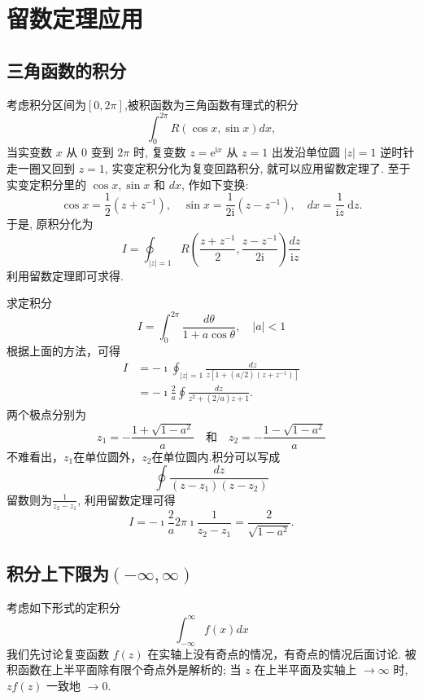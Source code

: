 \section{留数定理应用}
\subsection{三角函数的积分}
考虑积分区间为$\left[ 0, 2\pi \right]$,被积函数为三角函数有理式的积分
\begin{equation}
    \int_{0}^{2\pi} R(\cos{x}, \sin{x}) dx,
\end{equation}
当实变数 $x$ 从 0 变到 $2 \pi$ 时, 复变数 $z=\mathrm{e}^{\mathrm{i} x}$ 从 $z=1$ 出发沿单位圆 $|z|=1$ 逆时针 走一圈又回到 $z=1$,
实变定积分化为复变回路积分, 就可以应用留数定理了. 至于实变定积分里的 $\cos x, \sin x$ 和 $d x$, 作如下变换:
$$
\cos x=\frac{1}{2}\left(z+z^{-1}\right), \quad \sin x=\frac{1}{2 \mathrm{i}}\left(z-z^{-1}\right), \quad d x=\frac{1}{\mathrm{i} z} \mathrm{~d} z .
$$
于是, 原积分化为
$$
I=\oint_{|z|=1} R\left(\frac{z+z^{-1}}{2}, \frac{z-z^{-1}}{2 \mathrm{i}}\right) \frac{d z}{\mathrm{i} z}
$$
利用留数定理即可求得.

\begin{examplebox}{求定积分\[I=\int_0^{2 \pi} \frac{d \theta}{1+a \cos \theta}, \quad|a|<1 \]}
    根据上面的方法，可得
    \[
        \begin{aligned}
        I & =-\imath \oint_{|z|=1} \frac{d z}{z\left[1+(a / 2)\left(z+z^{-1}\right)\right]} \\
        & =-\imath \frac{2}{a} \oint \frac{d z}{z^2+(2 / a) z+1} .
        \end{aligned}
    \]
    两个极点分别为
    \[
        z_1=-\frac{1+\sqrt{1-a^2}}{a} \quad \text {和} \quad z_2=-\frac{1-\sqrt{1-a^2}}{a}
    \]
    不难看出，$z_1$在单位圆外，$z_2$在单位圆内.积分可以写成
    \[
      \oint \frac{dz}{(z-z_1)(z-z_2)}   
    \]
    留数则为$\frac{1}{z_2 - z_1}$, 利用留数定理可得 
    \[
      I=  -\imath \frac{2}{a} 2\pi\imath \frac{1}{z_2 - z_1} = \frac{2}{\sqrt{1 - a^2}} . 
    \]
\end{examplebox}



\subsection{积分上下限为$\left( -\infty, \infty \right)$}
 考虑如下形式的定积分
 \[
    \int_{-\infty}^{\infty} f(x) dx
 \]
 我们先讨论复变函数 $f(z)$ 在实轴上没有奇点的情况，有奇点的情况后面讨论. 
被积函数在上半平面除有限个奇点外是解析的; 当 $z$ 在上半平面及实轴上 $\to \infty$ 时, 
$z f(z)$ 一致地 $\to 0$.

